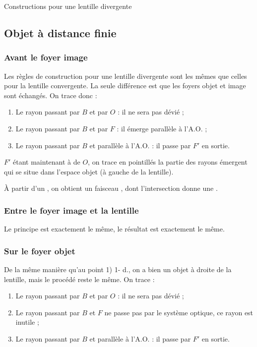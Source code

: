 \documentclass[10pt,a5paper,notitlepage]{book}
\begin{document}
\begin{center}
    \huge Constructions pour une lentille divergente
\end{center}

\setcounter{subsection}{0}
\subsection{Objet à distance finie}
\subsubsection{Avant le foyer image}
Les règles de construction pour une lentille divergente sont les mêmes que
celles pour la lentille convergente. La seule différence est que les foyers
objet et image sont échangés. On trace donc :

\begin{enumerate}
    \item Le rayon passant par $B$ et par $O$ : il ne sera pas dévié ;
    \item Le rayon passant par $B$ et par $F$ : il émerge parallèle à l'A.O. ;
    \item Le rayon passant par $B$ et parallèle à l'A.O. : il passe par $F'$ en
        sortie.
\end{enumerate}

$F'$ étant maintenant à  de $O$, on trace en pointillés la partie des
rayons émergent qui se situe dans l'espace objet (à gauche de la lentille).
\bigbreak

À partir d'un , on obtient un faisceau , dont
l'intersection donne une .

\subsubsection{Entre le foyer image et la lentille}
Le principe est exactement le même, le résultat est exactement le même.

\subsubsection{Sur le foyer objet}
De la même manière qu'au point \textcolor{capri}{1) 1- d.}, on a bien un objet à
droite de la lentille, mais le procédé reste le même. On trace :

\begin{enumerate}
    \item Le rayon passant par $B$ et par $O$ : il ne sera pas dévié ;
    \item Le rayon passant par $B$ et $F$ ne passe pas par le système optique,
        ce rayon est inutile ;
    \item Le rayon passant par $B$ et parallèle à l'A.O. : il passe par $F'$ en
        sortie.
\end{enumerate}
\end{document}

